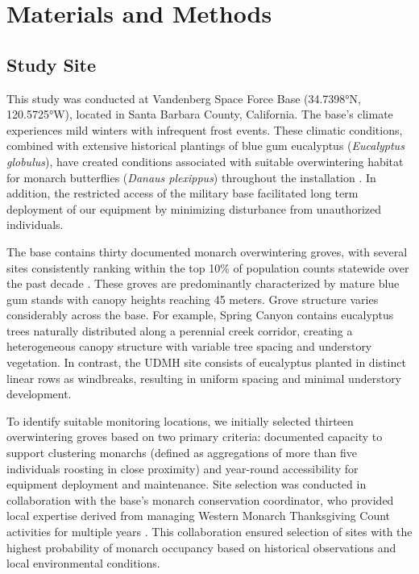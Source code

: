 \section{Materials and Methods}

\subsection{Study Site}

This study was conducted at Vandenberg Space Force Base (34.7398°N, 120.5725°W), located in Santa Barbara County, California. The base's climate experiences mild winters with infrequent frost events. These climatic conditions, combined with extensive historical plantings of blue gum eucalyptus (\textit{Eucalyptus globulus}), have created conditions associated with suitable overwintering habitat for monarch butterflies (\textit{Danaus plexippus}) throughout the installation \autocite{xercesGuideWesternMonarch2025}. In addition, the restricted access of the military base facilitated long term deployment of our equipment by minimizing disturbance from unauthorized individuals.

The base contains thirty documented monarch overwintering groves, with several sites consistently ranking within the top 10\% of population counts statewide over the past decade \autocite{xercesGuideWesternMonarch2025}. These groves are predominantly characterized by mature blue gum stands with canopy heights reaching 45 meters. Grove structure varies considerably across the base. For example, Spring Canyon contains eucalyptus trees naturally distributed along a perennial creek corridor, creating a heterogeneous canopy structure with variable tree spacing and understory vegetation. In contrast, the UDMH site consists of eucalyptus planted in distinct linear rows as windbreaks, resulting in uniform spacing and minimal understory development.

To identify suitable monitoring locations, we initially selected thirteen overwintering groves based on two primary criteria: documented capacity to support clustering monarchs (defined as aggregations of more than five individuals roosting in close proximity) and year-round accessibility for equipment deployment and maintenance. Site selection was conducted in collaboration with the base's monarch conservation coordinator, who provided local expertise derived from managing Western Monarch Thanksgiving Count activities for multiple years \autocite{xercesGuideWesternMonarch2025}. This collaboration ensured selection of sites with the highest probability of monarch occupancy based on historical observations and local environmental conditions.

